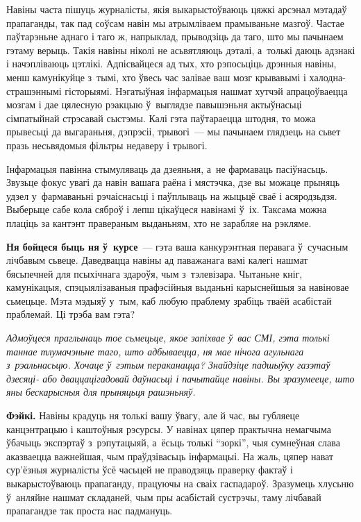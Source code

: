 Навіны часта пішуць журналісты, якія выкарыстоўваюць цяжкі арсэнал мэтадаў прапаганды, так пад соўсам навін мы атрымліваем прамываньне мазгоў. Частае паўтарэньне аднаго і таго ж, напрыклад, прыводзіць да таго, што мы пачынаем гэтаму верыць. Такія навіны ніколі не асьвятляюць дэталі, а~толькі даюць адзнакі і начэпліваюць цэтлікі. Адпісвайцеся ад тых, хто рэпосьціць дрэнныя навіны, менш камунікуйце з~тымі, хто ўвесь час залівае ваш мозг крывавымі і халодна-страшэннымі гісторыямі. Нэгатыўная інфармацыя нашмат хутчэй апрацоўваецца мозгам і дае цялесную рэакцыю ў~выглядзе павышэньня актыўнасьці сімпатыйнай стрэсавай сыстэмы. Калі гэта паўтараецца штодня, то можа прывесьці да выгараньня, дэпрэсіі, трывогі~--- мы пачынаем глядзець на сьвет празь несьвядомыя фільтры недаверу і трывогі.


Інфармацыя павінна стымуляваць да дзеяньня, а~не фармаваць пасіўнасьць. Звузьце фокус увагі да навін вашага раёна і мястэчка, дзе вы можаце прыняць удзел у~фармаваньні рэчаіснасьці і паўплываць на жыцьцё сваё і асяродзьдзя. Выберыце сабе кола сяброў і лепш цікаўцеся навінамі ў~іх. Таксама можна плаціць за кантэнт правераным выданьням, хто не зарабляе на рэкляме.

\textbf{Ня бойцеся быць ня ў~курсе}~--- гэта ваша канкурэнтная перавага ў~сучасным лічбавым сьвеце. Даведвацца навіны ад паважанага вамі калегі нашмат бясьпечней для псыхічнага здароўя, чым з~тэлевізара. Чытаньне кніг, камунікацыя, спэцыялізаваныя прафэсійныя выданьні карыснейшыя за навіновае сьмецьце. Мэта мэдыяў у~тым, каб любую праблему зрабіць тваёй асабістай праблемай. Ці трэба вам гэта?

\emph{Адмоўцеся праглынаць тое сьмецьце, якое запіхвае ў~вас СМІ, гэта толькі таннае тлумачэньне таго, што адбываецца, ня мае нічога агульнага з~рэальнасьцю. Хочаце ў~гэтым пераканацца? Знайдзіце падшыўку газэтаў дзесяці- або дваццацігадовай даўнасьці і пачытайце навіны. Вы зразумееце, што яны бескарысныя для прыняцьця рашэньняў.}

\textbf{Фэйкі.} Навіны крадуць ня толькі вашу ўвагу, але й час, вы губляеце канцэнтрацыю і каштоўныя рэсурсы. У навінах цяпер практычна немагчыма ўбачыць экспэртаў з~рэпутацыяй, а~ёсьць толькі ``зоркі'', чыя сумнеўная слава аказваецца важнейшая, чым праўдзівасьць інфармацыі. На жаль, цяпер нават сур'ёзныя журналісты ўсё часьцей не праводзяць праверку фактаў і выкарыстоўваюць прапаганду, працуючы на сваіх гаспадароў. Зразумець хлусьню ў~анляйне нашмат складаней, чым пры асабістай сустрэчы, таму лічбавай прапагандзе так проста нас падмануць.

